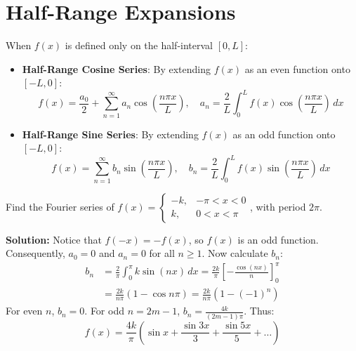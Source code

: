\section{Half-Range Expansions}
When $f(x)$ is defined only on the half-interval $[0, L]$:
\begin{itemize}
    \item \textbf{Half-Range Cosine Series}: By extending $f(x)$ as an even function onto $[-L, 0]$:
    \begin{equation}
    f(x) = \frac{a_0}{2} + \sum_{n=1}^{\infty} a_n \cos\left(\frac{n\pi x}{L}\right), \quad a_n = \frac{2}{L}\int_0^L f(x)\cos\left(\frac{n\pi x}{L}\right)\,dx
    \end{equation}
    \item \textbf{Half-Range Sine Series}: By extending $f(x)$ as an odd function onto $[-L, 0]$:
    \begin{equation}
    f(x) = \sum_{n=1}^{\infty} b_n \sin\left(\frac{n\pi x}{L}\right), \quad b_n = \frac{2}{L}\int_0^L f(x)\sin\left(\frac{n\pi x}{L}\right)\,dx
    \end{equation}
\end{itemize}

\begin{example}
Find the Fourier series of $f(x) = \begin{cases} -k, & -\pi < x < 0 \\ k, & 0 < x < \pi \end{cases}$, with period $2\pi$.

\textbf{Solution:}
Notice that $f(-x) = -f(x)$, so $f(x)$ is an odd function.
Consequently, $a_0 = 0$ and $a_n = 0$ for all $n \ge 1$.
Now calculate $b_n$:
\begin{align*}
b_n &= \frac{2}{\pi}\int_0^{\pi} k \sin(nx) \, dx = \frac{2k}{\pi} \left[ -\frac{\cos(nx)}{n} \right]_0^{\pi} \\
    &= \frac{2k}{n\pi} (1 - \cos n\pi) = \frac{2k}{n\pi} (1 - (-1)^n)
\end{align*}
For even $n$, $b_n = 0$. For odd $n = 2m-1$, $b_n = \frac{4k}{(2m-1)\pi}$.
Thus:
\begin{equation*}
f(x) = \frac{4k}{\pi}\left( \sin x + \frac{\sin 3x}{3} + \frac{\sin 5x}{5} + \dots \right)
\end{equation*}
\end{example}
